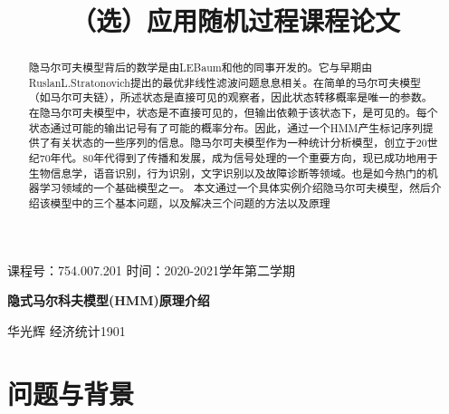 \documentclass[a4paper,12pt]{ctexart}     %
\begin{document}
\songti{}
	
	
	
	{\heiti
		\title{（选）应用随机过程课程论文\vspace{-4em}}
		\date{}
		\maketitle
	}

	\thispagestyle{fancy} %
	
	\begin{center}
		课程号：754.007.201 \quad 时间：2020-2021学年第二学期
	\end{center}
	\vspace*{3\baselineskip}
	\begin{center}\songti{}
		\textbf{隐式马尔科夫模型(HMM)原理介绍}
	\end{center}
	
	\begin{center}
		华光辉 \quad 经济统计1901 
	\end{center}

	\vspace*{2\baselineskip}   %


	\begin{spacing}{1.25}

	\begin{abstract}
		隐马尔可夫模型背后的数学是由LEBaum和他的同事开发的。它与早期由RuslanL.Stratonovich提出的最优非线性滤波问题息息相关。在简单的马尔可夫模型（如马尔可夫链），所述状态是直接可见的观察者，因此状态转移概率是唯一的参数。在隐马尔可夫模型中，状态是不直接可见的，但输出依赖于该状态下，是可见的。每个状态通过可能的输出记号有了可能的概率分布。因此，通过一个HMM产生标记序列提供了有关状态的一些序列的信息。隐马尔可夫模型作为一种统计分析模型，创立于20世纪70年代。80年代得到了传播和发展，成为信号处理的一个重要方向，现已成功地用于生物信息学，语音识别，行为识别，文字识别以及故障诊断等领域。也是如今热门的机器学习领域的一个基础模型之一。
		本文通过一个具体实例介绍隐马尔可夫模型，然后介绍该模型中的三个基本问题，以及解决三个问题的方法以及原理
		
		\vspace*{1\baselineskip}   %
	\end{abstract}
	\end{spacing}

	
	
	\section{问题与背景}
	
\end{document}

